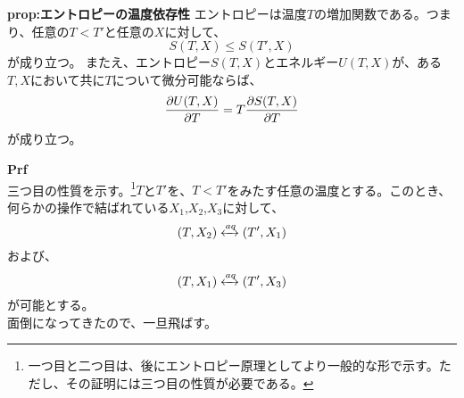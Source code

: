 \documentclass[a4paper,11pt]{jsarticle}
\begin{document}
\begin{itembox}[l]{\textbf{prop:エントロピーの温度依存性}}
エントロピーは温度$T$の増加関数である。つまり、任意の$T<T'$と任意の$X$に対して、
\begin{equation}
    S(T,X) \leq S(T',X)
\end{equation}
が成り立つ。
またえ、エントロピー$S(T,X)$とエネルギー$U(T,X)$が、ある$T,X$において共に$T$について微分可能ならば、
\begin{equation}
    \pdv{U(T,X)}{T} = T\pdv{S(T,X)}{T}
\end{equation}
が成り立つ。
\end{itembox}
\textbf{Prf}\\
三つ目の性質を示す。\footnote{一つ目と二つ目は、後にエントロピー原理としてより一般的な形で示す。ただし、その証明には三つ目の性質が必要である。}$T$と$T'$を、$T < T'$をみたす任意の温度とする。このとき、何らかの操作で結ばれている$X_1$,$X_2$,$X_3$に対して、
\begin{equation}
    (T,X_2) \xleftrightarrow{aq} (T',X_1)
\end{equation}
および、
\begin{equation}
    (T,X_1) \xleftrightarrow{aq} (T',X_3)
\end{equation}
が可能とする。\\
面倒になってきたので、一旦飛ばす。\\
\end{document}
